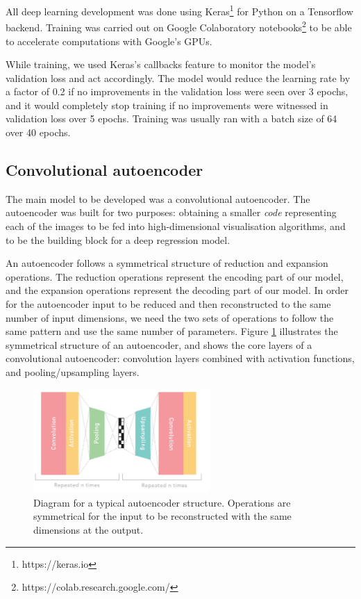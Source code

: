 All deep learning development was done using Keras\footnote{https://keras.io} for Python on a Tensorflow backend. Training was carried out on Google Colaboratory notebooks\footnote{https://colab.research.google.com/} to be able to accelerate computations with Google's GPUs.

While training, we used Keras's callbacks feature to monitor the model's validation loss and act accordingly. The model would reduce the learning rate by a factor of 0.2 if no improvements in the validation loss were seen over 3 epochs, and it would completely stop training if no improvements were witnessed in validation loss over 5 epochs. Training was usually ran with a batch size of 64 over 40 epochs.

\subsection{Convolutional autoencoder}

The main model to be developed was a convolutional autoencoder. The autoencoder was built for two purposes: obtaining a smaller \textit{code} representing each of the images to be fed into high-dimensional visualisation algorithms, and to be the building block for a deep regression model.

An autoencoder follows a symmetrical structure of reduction and expansion operations. The reduction operations represent the encoding part of our model, and the expansion operations represent the decoding part of our model. In order for the autoencoder input to be reduced and then reconstructed to the same number of input dimensions, we need the two sets of operations to follow the same pattern and use the same number of parameters. Figure \ref{fig:symmstruc} illustrates the symmetrical structure of an autoencoder, and shows the core layers of a convolutional autoencoder: convolution layers combined with activation functions, and pooling/upsampling layers.

\begin{figure}[h]
    \centering
    \includegraphics[width=0.6\textwidth]{dissertation/figures/autoencoder_repeat_structure.png}
    \caption{Diagram for a typical autoencoder structure. Operations are symmetrical for the input to be reconstructed with the same dimensions at the output.}
    \label{fig:symmstruc}
\end{figure}

